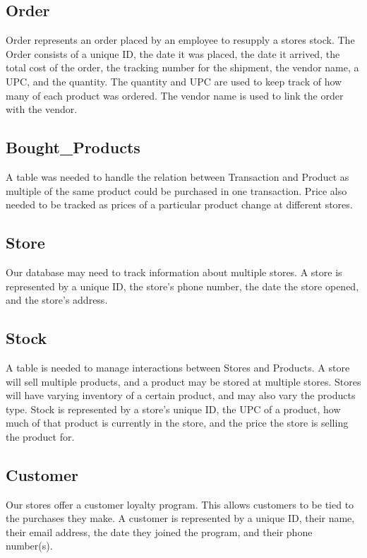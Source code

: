 \documentclass[12pt]{article}
\begin{document}
		\subsection{Order}
			Order represents an order placed by an employee to resupply a stores
			stock. The Order consists of a unique ID, the date it was placed, the date
			it arrived, the total cost of the order, the tracking number for the
			shipment, the vendor name, a UPC, and the quantity. The quantity and UPC
			are used to keep track of how many of each product was ordered. The vendor
			name is used to link the order with the vendor.

		\subsection{Bought\_Products}
			A table was needed to handle the relation between Transaction and Product
			as multiple of the same product could be purchased in one transaction.
			Price also needed to be tracked as prices of a particular product change
			at different stores.

		\subsection{Store}
			Our database may need to track information about multiple stores. A store
			is represented by a unique ID, the store's phone number, the date the
			store opened, and the store's address.

		\subsection{Stock}
			A table is needed to manage interactions between Stores and Products.
			A store will sell multiple products, and a product may be stored at
			multiple stores. Stores will have varying inventory of a certain product,
			and may also vary the products type. Stock is represented by a store's
			unique ID, the UPC of a product, how much of that product is currently in
			the store, and the price the store is selling the product for.

		\subsection{Customer}
			Our stores offer a customer loyalty program. This allows customers to be
			tied to the purchases they make. A customer is represented by a unique ID,
			their name, their email address, the date they joined the program, and
			their phone number(s).
\end{document}

